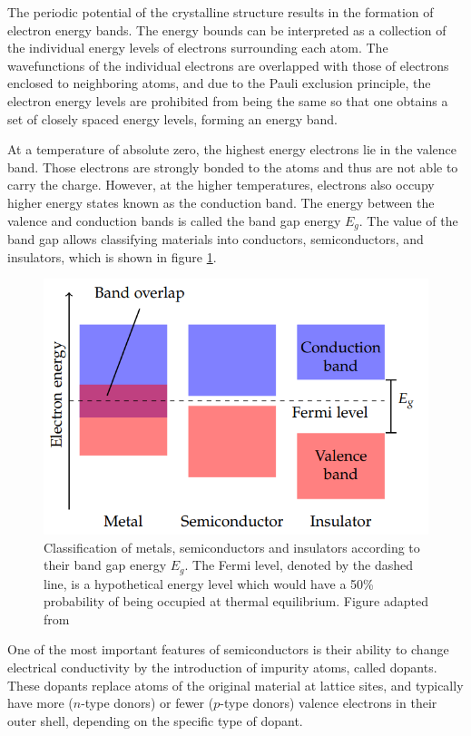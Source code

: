 The periodic potential of the crystalline structure results in the formation of electron energy bands. The energy bounds can be interpreted as a collection of the individual energy levels of electrons surrounding each atom. The wavefunctions of the individual electrons are overlapped with those of electrons enclosed to neighboring atoms, and due to the Pauli exclusion principle, the electron energy levels are prohibited from being the same so that one obtains a set of closely spaced energy levels, forming an energy band. 

At a temperature of absolute zero, the highest energy electrons lie in the valence band. Those electrons are strongly bonded to the atoms and thus are not able to carry the charge.  However, at the higher temperatures, electrons also occupy higher energy states known as the conduction band. The energy between the valence and conduction bands is called the band gap energy $E_g$.  The value of the band gap allows classifying materials into conductors, semiconductors, and insulators, which is shown in figure \ref{fig:boundgap}. 


\begin{figure}[h]
\centering
\includegraphics[scale=0.7]{figures/bound_gap.PNG}
\caption{Classification of metals, semiconductors and insulators according to their
band gap energy $E_g$. The Fermi level, denoted by the dashed line, is a hypothetical energy level which would have a 50\% probability of being occupied at thermal equilibrium.  Figure adapted from \cite{radiation_damage}}
\label{fig:boundgap}
\end{figure}

One of the most important features of semiconductors is their ability to change electrical conductivity by the introduction of impurity atoms, called dopants. These dopants replace atoms of the original material at lattice sites, and typically have more ($n$-type donors) or fewer ($p$-type donors) valence electrons in their outer shell, depending on the specific type of dopant. 


